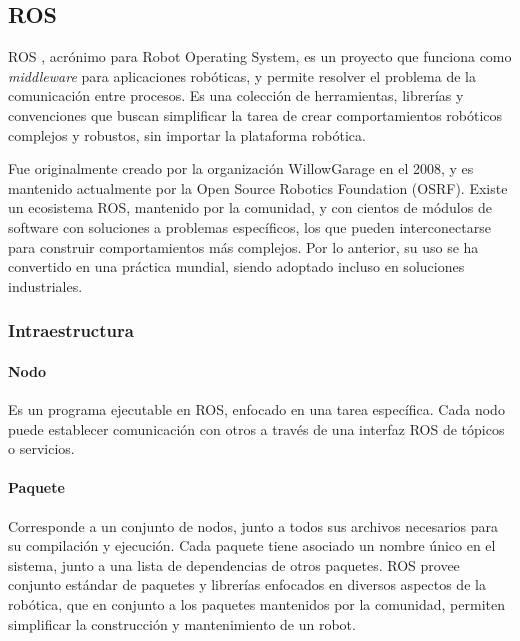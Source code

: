 \subsection{ROS}

ROS \cite{ROS:2009}, acrónimo para Robot Operating System, es un proyecto que funciona como \textit{middleware} para aplicaciones robóticas, y permite resolver el problema de la comunicación entre procesos. Es una colección de herramientas, librerías y convenciones que buscan simplificar la tarea de crear comportamientos robóticos complejos y robustos, sin importar la plataforma robótica.

Fue originalmente creado por la organización WillowGarage en el 2008, y es mantenido actualmente por la Open Source Robotics Foundation (OSRF). Existe un ecosistema ROS, mantenido por la comunidad, y con cientos de módulos de software con soluciones a problemas específicos, los que pueden interconectarse para construir comportamientos más complejos. Por lo anterior, su uso se ha convertido en una práctica mundial, siendo adoptado incluso en soluciones industriales.


\subsubsection{Intraestructura}

\paragraph{Nodo}
Es un programa ejecutable en ROS, enfocado en una tarea específica. Cada nodo puede establecer comunicación con otros a través de una interfaz ROS de tópicos o servicios.

\paragraph{Paquete}
Corresponde a un conjunto de nodos, junto a todos sus archivos necesarios para su compilación y ejecución. Cada paquete tiene asociado un nombre único en el sistema, junto a una lista de dependencias de otros paquetes. ROS provee conjunto estándar de paquetes y librerías enfocados en diversos aspectos de la robótica, que en conjunto a los paquetes mantenidos por la comunidad, permiten simplificar la construcción y mantenimiento de un robot.

